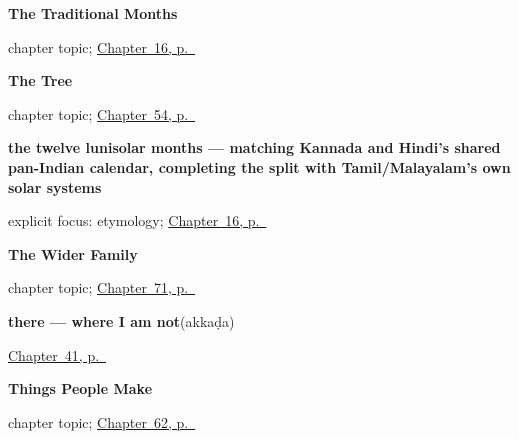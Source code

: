 \noindent\begin{minipage}[t]{\linewidth}
\raggedright
\textbf{The Traditional Months}\par
\footnotesize chapter topic; \hyperref[ch:te-traditional-months]{Chapter~16, p.~\pageref*{ch:te-traditional-months}}
\end{minipage}\par\smallskip

\noindent\begin{minipage}[t]{\linewidth}
\raggedright
\textbf{The Tree}\par
\footnotesize chapter topic; \hyperref[ch:te-tree]{Chapter~54, p.~\pageref*{ch:te-tree}}
\end{minipage}\par\smallskip

\noindent\begin{minipage}[t]{\linewidth}
\raggedright
\textbf{the twelve lunisolar months — matching Kannada and Hindi's shared pan-Indian calendar, completing the split with Tamil/Malayalam's own solar systems}\enspace\emph{           }\par
\footnotesize explicit focus: etymology; \hyperref[ch:te-traditional-months]{Chapter~16, p.~\pageref*{ch:te-traditional-months}}
\end{minipage}\par\smallskip

\noindent\begin{minipage}[t]{\linewidth}
\raggedright
\textbf{The Wider Family}\par
\footnotesize chapter topic; \hyperref[ch:te-the-wider-family]{Chapter~71, p.~\pageref*{ch:te-the-wider-family}}
\end{minipage}\par\smallskip

\noindent\begin{minipage}[t]{\linewidth}
\raggedright
\textbf{there — where I am not}\enspace\emph{}\enspace(akkaḍa)\par
\footnotesize \hyperref[ch:te-pointing-and-asking]{Chapter~41, p.~\pageref*{ch:te-pointing-and-asking}}
\end{minipage}\par\smallskip

\noindent\begin{minipage}[t]{\linewidth}
\raggedright
\textbf{Things People Make}\par
\footnotesize chapter topic; \hyperref[ch:te-made-things]{Chapter~62, p.~\pageref*{ch:te-made-things}}
\end{minipage}\par\smallskip

